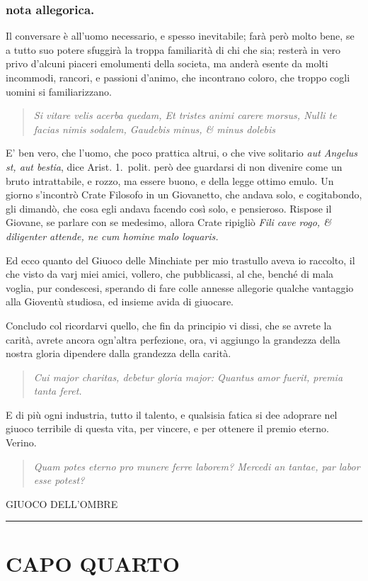 \documentclass[11pt,a6paper]{article}
\newcommand{\literaryquote}[1]{%
\kern -6pt  \begin{verse}
    {\footnotesize \it #1}
  \end{verse}\kern -2pt%
}
\newcommand{\supersection}[1]{%
\clearpage
    {\scshape \centering \huge #1\\}
    \vspace{6pt}
    \hrule
    \vspace{12pt}
}
\begin{document}
\subsubsection{nota allegorica.}
{\footnotesize
Il conversare è all'uomo necessario, e spesso
inevitabile; farà però molto bene, se a tutto suo
potere sfuggirà la troppa familiarità di chi che sia;
resterà in vero privo d'alcuni piaceri emolumenti
della societa, ma anderà esente da molti incommodi,
rancori, e passioni d'animo, che incontrano
coloro, che troppo cogli uomini si familiarizzano.
\literaryquote{Si vitare velis acerba quedam,
Et tristes animi carere morsus,
Nulli te facias nimis sodalem,
Gaudebis minus, \& minus dolebis}

E' ben vero, che l'uomo, che poco prattica altrui,
o che vive solitario \textit{aut Angelus st, aut bestia},
dice Arist. 1.\ polit. però dee guardarsi di non
divenire come un bruto intrattabile, e rozzo, ma essere
buono, e della legge ottimo emulo. Un giorno
s'incontrò Crate Filosofo in un Giovanetto, che andava
solo, e cogitabondo, gli dimandò, che cosa
egli andava facendo così solo, e pensieroso.
Rispose il Giovane, se parlare con se medesimo, allora
Crate ripigliò \textit{Fili cave rogo, \& diligenter
 attende, ne cum homine malo loquaris.}
}

Ed ecco quanto del Giuoco delle Minchiate
per mio trastullo aveva io raccolto, il che visto da
varj miei amici, vollero, che pubblicassi, al che,
benché di mala voglia, pur condescesi, sperando di
fare colle annesse allegorie qualche vantaggio alla
Gioventù studiosa, ed insieme avida di giuocare.

Concludo col ricordarvi quello, che fin
da principio vi dissi, che se avrete la carità,
avrete ancora ogn'altra perfezione, ora,
vi aggiungo la grandezza della nostra gloria
dipendere dalla grandezza della carità.
\literaryquote{Cui major charitas, debetur gloria major:
 Quantus amor fuerit, premia tanta feret.}

E di più ogni industria, tutto il talento, e
qualsisia fatica si dee adoprare nel giuoco
terribile di questa vita, per vincere, e per
ottenere il premio eterno. Verino.
\literaryquote{Quam potes eterno pro munere ferre laborem?
Mercedi an tantae, par labor esse potest?}







\supersection{GIUOCO DELL'OMBRE}

\section{CAPO QUARTO}
\end{document}
